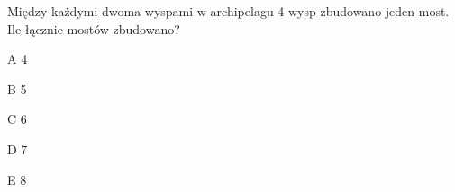 \begin{tresc}
Między każdymi dwoma wyspami w archipelagu 4 wysp zbudowano jeden most. Ile łącznie mostów zbudowano?
\end{tresc}
\begin{wariant}{A} 4 \end{wariant}
\begin{wariant}{B} 5 \end{wariant}
\begin{wariant}{C} 6 \end{wariant}
\begin{wariant}{D} 7 \end{wariant}
\begin{wariant}{E} 8 \end{wariant}
